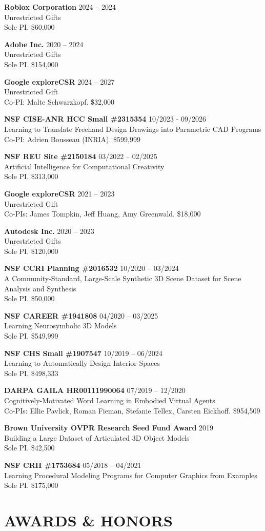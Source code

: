 \documentclass[line,margin]{res}
\begin{document}
\begin{resume}
\newcommand{\funding}[5] {
	\textbf{#1} \hfill #5\\
	#2 \\
	#3. #4
}

\funding
{Roblox Corporation}
{Unrestricted Gifts}
{Sole PI}
{\$60,000}
{2024 -- 2024}

\funding
{Adobe Inc.}
{Unrestricted Gifts}
{Sole PI}
{\$154,000}
{2020 -- 2024}

\funding
{Google exploreCSR}
{Unrestricted Gift}
{Co-PI: Malte Schwarzkopf}
{\$32,000}
{2024 -- 2027}

\funding
{NSF CISE-ANR HCC Small \#2315354}
{Learning to Translate Freehand Design Drawings into Parametric CAD Programs}
{Co-PI: Adrien Bousseau (INRIA)}
{\$599,999}
{10/2023 - 09/2026}

\funding
{NSF REU Site \#2150184}
{Artificial Intelligence for Computational Creativity}
{Sole PI}
{\$313,000}
{03/2022 -- 02/2025}

\funding
{Google exploreCSR}
{Unrestricted Gift}
{Co-PIs: James Tompkin, Jeff Huang, Amy Greenwald}
{\$18,000}
{2021 -- 2023}

\funding
{Autodesk Inc.}
{Unrestricted Gifts}
{Sole PI}
{\$120,000}
{2020 -- 2023}

\funding
{NSF CCRI Planning \#2016532}
{A Community-Standard, Large-Scale Synthetic 3D Scene Dataset for Scene Analysis and Synthesis}
{Sole PI}
{\$50,000}
{10/2020 -- 03/2024}

\funding
{NSF CAREER \#1941808}
{Learning Neurosymbolic 3D Models}
{Sole PI}
{\$549,999}
{04/2020 -- 03/2025}

\funding
{NSF CHS Small \#1907547}
{Learning to Automatically Design Interior Spaces}
{Sole PI}
{\$498,333}
{10/2019 -- 06/2024}

\funding
{DARPA GAILA HR00111990064}
{Cognitively-Motivated Word Learning in Embodied Virtual Agents}
{Co-PIs: Ellie Pavlick, Roman Fieman, Stefanie Tellex, Carsten Eickhoff}
{\$954,509}
{07/2019 -- 12/2020}

\funding
{Brown University OVPR Research Seed Fund Award}
{Building a Large Dataset of Articulated 3D Object Models}
{Sole PI}
{\$42,500}
{2019}

\funding
{NSF CRII \#1753684}
{Learning Procedural Modeling Programs for Computer Graphics from Examples}
{Sole PI}
{\$175,000}
{05/2018 -- 04/2021}


\section{AWARDS \& HONORS}


\end{resume}
\end{document}
